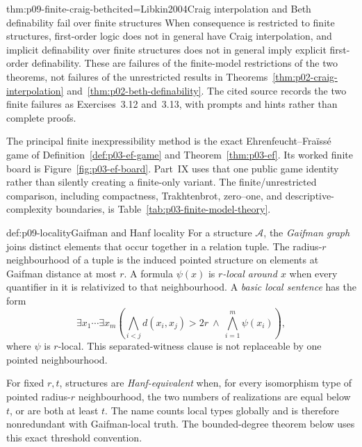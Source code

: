 \begin{hbtheorem}{thm:p09-finite-craig-beth}{cited=Libkin2004}{Craig interpolation and Beth definability fail over finite structures}
When consequence is restricted to finite structures, first-order logic does
not in general have Craig interpolation, and implicit definability over finite
structures does not in general imply explicit first-order definability.  These
are failures of the finite-model restrictions of the two theorems, not failures
of the unrestricted results in
Theorems~\ref{thm:p02-craig-interpolation}
and~\ref{thm:p02-beth-definability}.
The cited source records the two finite failures as Exercises~3.12 and~3.13,
with prompts and hints rather than complete proofs.
\end{hbtheorem}

The principal finite inexpressibility method is the exact
Ehrenfeucht--Fra\"iss\'e game of
Definition~\ref{def:p03-ef-game} and
Theorem~\ref{thm:p03-ef}.  Its worked finite board is
Figure~\ref{fig:p03-ef-board}.  Part~IX uses that one public game identity
rather than silently creating a finite-only variant.
The finite/unrestricted comparison, including compactness, Trakhtenbrot,
zero--one, and descriptive-complexity boundaries, is
Table~\ref{tab:p03-finite-model-theory}.

\begin{hbdefinition}{def:p09-locality}{Gaifman and Hanf locality}
For a structure \(\mathcal A\), the \emph{Gaifman graph} joins distinct elements that
occur together in a relation tuple. The radius-\(r\) neighbourhood of a tuple
is the induced pointed structure on elements at Gaifman distance at most
\(r\).  A formula \(\psi(x)\) is \emph{\(r\)-local around \(x\)} when every
quantifier in it is relativized to that neighbourhood.  A \emph{basic local
sentence} has the form
\[
 \exists x_1\cdots\exists x_m
 \left(
   \bigwedge_{i<j} d(x_i,x_j)>2r
   \ \land\
   \bigwedge_{i=1}^{m}\psi(x_i)
 \right),
\]
where \(\psi\) is \(r\)-local.  This separated-witness clause is not
replaceable by one pointed neighbourhood.

For fixed \(r,t\), structures are \emph{Hanf-equivalent} when, for every
isomorphism type of pointed radius-\(r\) neighbourhood, the two numbers of
realizations are equal below \(t\), or are both at least \(t\).  The name
counts local types globally and is therefore nonredundant with Gaifman-local
truth.  The bounded-degree theorem below uses this exact threshold convention.
\index{Gaifman graph}\index{Gaifman locality}\index{Hanf locality}
\end{hbdefinition}

